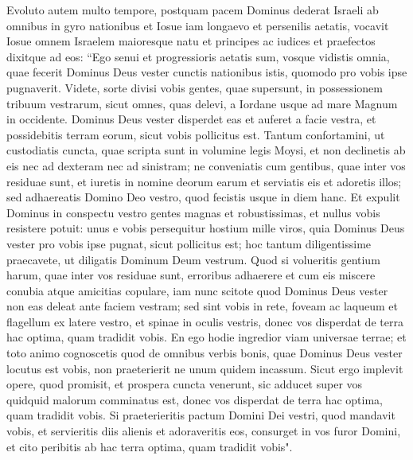 \begin{biblechapter}  
\verse Evoluto autem multo tempore, postquam pacem Dominus dederat Israeli ab omnibus in gyro nationibus et Iosue iam longaevo et persenilis aetatis, 
\verse vocavit Iosue omnem Israelem maioresque natu et principes ac iudices et praefectos dixitque ad eos: “Ego senui et progressioris aetatis sum, 
\verse vosque vidistis omnia, quae fecerit Dominus Deus vester cunctis nationibus istis, quomodo pro vobis ipse pugnaverit. 
\verse Videte, sorte divisi vobis gentes, quae supersunt, in possessionem tribuum vestrarum, sicut omnes, quas delevi, a Iordane usque ad mare Magnum in occidente. 
\verse Dominus Deus vester disperdet eas et auferet a facie vestra, et possidebitis terram eorum, sicut vobis pollicitus est. 
\verse Tantum confortamini, ut custodiatis cuncta, quae scripta sunt in volumine legis Moysi, et non declinetis ab eis nec ad dexteram nec ad sinistram; 
\verse ne conveniatis cum gentibus, quae inter vos residuae sunt, et iuretis in nomine deorum earum et serviatis eis et adoretis illos;  
\verse sed adhaereatis Domino Deo vestro, quod fecistis usque in diem hanc. 
\verse Et expulit Dominus in conspectu vestro gentes magnas et robustissimas, et nullus vobis resistere potuit: 
\verse unus e vobis persequitur hostium mille viros, quia Dominus Deus vester pro vobis ipse pugnat, sicut pollicitus est; 
\verse hoc tantum diligentissime praecavete, ut diligatis Dominum Deum vestrum. 
\verse Quod si volueritis gentium harum, quae inter vos residuae sunt, erroribus adhaerere et cum eis miscere conubia atque amicitias copulare, 
\verse iam nunc scitote quod Dominus Deus vester non eas deleat ante faciem vestram; sed sint vobis in rete, foveam ac laqueum et flagellum ex latere vestro, et spinae in oculis vestris, donec vos disperdat de terra hac optima, quam tradidit vobis. 
\verse En ego hodie ingredior viam universae terrae; et toto animo cognoscetis quod de omnibus verbis bonis, quae Dominus Deus vester locutus est vobis, non praeterierit ne unum quidem incassum. 
\verse Sicut ergo implevit opere, quod promisit, et prospera cuncta venerunt, sic adducet super vos quidquid malorum comminatus est, donec vos disperdat de terra hac optima, quam tradidit vobis.  
\verse Si praeterieritis pactum Domini Dei vestri, quod mandavit vobis, et servieritis diis alienis et adoraveritis eos, consurget in vos furor Domini, et cito peribitis ab hac terra optima, quam tradidit vobis". 
\end{biblechapter}

